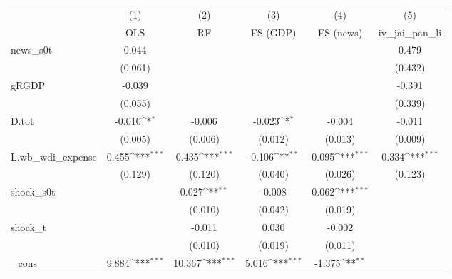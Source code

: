 {
\def\sym#1{\ifmmode^{#1}\else\(^{#1}\)\fi}
\begin{tabular}{l*{5}{c}}
\toprule
            &\multicolumn{1}{c}{(1)}&\multicolumn{1}{c}{(2)}&\multicolumn{1}{c}{(3)}&\multicolumn{1}{c}{(4)}&\multicolumn{1}{c}{(5)}\\
            &\multicolumn{1}{c}{OLS}&\multicolumn{1}{c}{RF}&\multicolumn{1}{c}{FS (GDP)}&\multicolumn{1}{c}{FS (news)}&\multicolumn{1}{c}{iv\_jai\_pan\_li}\\
\midrule
news\_s0t    &       0.044         &                     &                     &                     &       0.479         \\
            &     (0.061)         &                     &                     &                     &     (0.432)         \\
\addlinespace
gRGDP       &      -0.039         &                     &                     &                     &      -0.391         \\
            &     (0.055)         &                     &                     &                     &     (0.339)         \\
\addlinespace
D.tot       &      -0.010\sym{*}  &      -0.006         &      -0.023\sym{*}  &      -0.004         &      -0.011         \\
            &     (0.005)         &     (0.006)         &     (0.012)         &     (0.013)         &     (0.009)         \\
\addlinespace
L.wb\_wdi\_expense&       0.455\sym{***}&       0.435\sym{***}&      -0.106\sym{**} &       0.095\sym{***}&       0.334\sym{***}\\
            &     (0.129)         &     (0.120)         &     (0.040)         &     (0.026)         &     (0.123)         \\
\addlinespace
shock\_s0t   &                     &       0.027\sym{**} &      -0.008         &       0.062\sym{***}&                     \\
            &                     &     (0.010)         &     (0.042)         &     (0.019)         &                     \\
\addlinespace
shock\_t     &                     &      -0.011         &       0.030         &      -0.002         &                     \\
            &                     &     (0.010)         &     (0.019)         &     (0.011)         &                     \\
\addlinespace
\_cons      &       9.884\sym{***}&      10.367\sym{***}&       5.016\sym{***}&      -1.375\sym{**} &                     \\

\end{tabular}}
